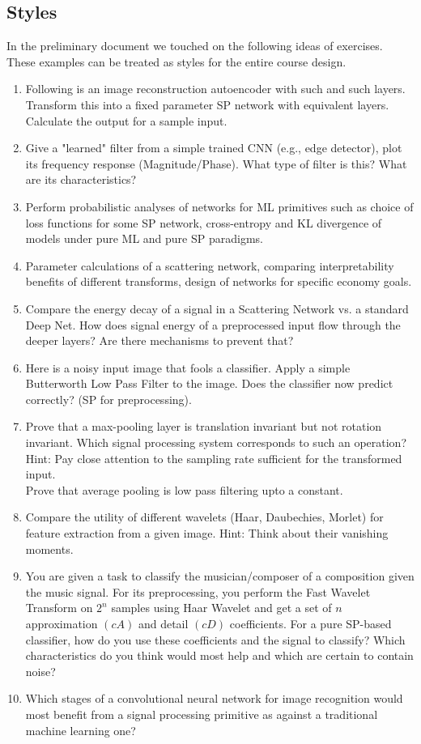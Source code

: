 \documentclass[12pt]{article}
\begin{document}
\subsection{Styles}
In the preliminary document we touched on the following ideas of exercises. These examples can be treated as styles for the entire course design.
\begin{enumerate}
    \item Following is an image reconstruction autoencoder with such and such layers. Transform this into a fixed parameter SP network with equivalent layers. Calculate the output for a sample input.
    \item Give a "learned" filter from a simple trained CNN (e.g., edge detector), plot its frequency response (Magnitude/Phase). What type of filter is this? What are its characteristics?
    \item Perform probabilistic analyses of networks for ML primitives such as choice of loss functions for some SP network, cross-entropy and KL divergence of models under pure ML and pure SP paradigms.
    \item Parameter calculations of a scattering network, comparing interpretability benefits of different transforms, design of networks for specific economy goals.
    \item Compare the energy decay of a signal in a Scattering Network vs. a standard Deep Net. How does signal energy of a preprocessed input flow through the deeper layers? Are there mechanisms to prevent that?
    \item Here is a noisy input image that fools a classifier. Apply a simple Butterworth Low Pass Filter to the image. Does the classifier now predict correctly? (SP for preprocessing).
    \item Prove that a max-pooling layer is translation invariant but not rotation invariant. Which signal processing system corresponds to such an operation? Hint: Pay close attention to the sampling rate sufficient for the transformed input. \\ Prove that average pooling is low pass filtering upto a constant.
    \item Compare the utility of different wavelets (Haar, Daubechies, Morlet) for feature extraction from a given image. Hint: Think about their vanishing moments.
    \item You are given a task to classify the musician/composer of a composition given the music signal. For its preprocessing, you perform the Fast Wavelet Transform on $2^n$ samples using Haar Wavelet and get a set of $n$ approximation $(cA)$ and detail $(cD)$ coefficients. For a pure SP-based classifier, how do you use these coefficients and the signal to classify? Which characteristics do you think would most help and which are certain to contain noise?
    \item Which stages of a convolutional neural network for image recognition would most benefit from a signal processing primitive as against a traditional machine learning one?
\end{enumerate}
\end{document}
